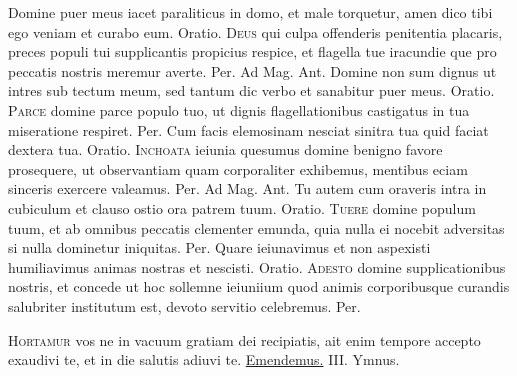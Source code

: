\begin{multicols*}{2}
 Domine puer meus iacet paraliticus in domo, et male torquetur, amen dico tibi ego veniam et curabo eum. {\color{Red} Oratio.}
\lettrine[lines=2]{\zallmancaps \color{Blue} D}{eus} qui culpa offenderis penitentia placaris, preces populi tui supplicantis propicius respice, et flagella tue iracundie que pro peccatis nostris meremur averte. Per. {\color{Red} Ad Mag. Ant.} Domine non sum dignus ut intres sub tectum meum, sed tantum dic verbo et sanabitur puer meus. {\color{Red} Oratio.}
\lettrine[lines=2]{\zallmancaps \color{Red} P}{arce} domine parce populo tuo, ut dignis flagellationibus castigatus in tua miseratione respiret. Per.
 Cum facis elemosinam nesciat sinitra tua quid faciat dextera tua. {\color{Red} Oratio.}
\lettrine[lines=2]{\zallmancaps \color{Blue} I}{nchoata} ieiunia quesumus domine benigno favore prosequere, ut observantiam quam corporaliter exhibemus, mentibus eciam sinceris exercere valeamus. Per. {\color{Red} Ad Mag. Ant.} Tu autem cum oraveris intra in cubiculum et clauso ostio ora patrem tuum. {\color{Red} Oratio.}
\lettrine[lines=2]{\zallmancaps \color{Blue} T}{uere} domine populum tuum, et ab omnibus peccatis clementer emunda, quia nulla ei nocebit adversitas si nulla dominetur iniquitas. Per.
 Quare ieiunavimus et non aspexisti humiliavimus animas nostras et nescisti. {\color{Red} Oratio.}
\lettrine[lines=2]{\zallmancaps \color{Blue} A}{desto} domine supplicationibus nostris, et concede ut hoc sollemne ieiuniium quod animis corporibusque curandis salubriter institutum est, devoto servitio celebremus. Per.
{\color{Red} }
\par {}
\lettrine[lines=2]{\zallmancaps \color{Red} H}{ortamur} vos ne in vacuum gratiam dei recipiatis, ait enim tempore accepto exaudivi te, et in die salutis adiuvi te. \R \hyperlink{emendemus-in-melius}{Emendemus.} {\color{Red} III. Ymnus.}
\end{multicols*}
